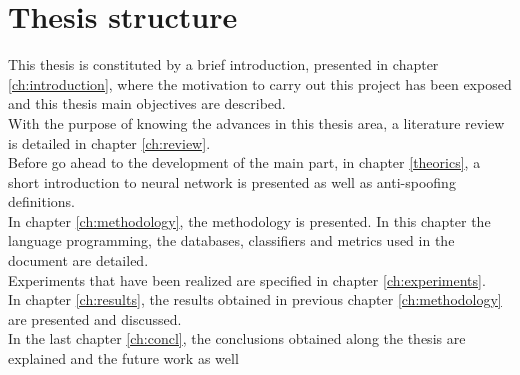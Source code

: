 \section{Thesis structure}
This thesis is constituted by a brief introduction, presented in chapter \ref{ch:introduction}, where the motivation to carry out this project has been exposed and this thesis main objectives are described.\\

With the purpose of knowing the advances in this thesis area, a literature review is detailed in chapter \ref{ch:review}.\\

Before go ahead to the development of the main part, in chapter \ref{theorics}, a short introduction to neural network is presented as well as anti-spoofing definitions.\\

In chapter \ref{ch:methodology}, the methodology is presented. In this chapter the language programming, the databases, classifiers and metrics used in the document are detailed.\\

Experiments that have been realized are specified in chapter \ref{ch:experiments}.\\

In chapter \ref{ch:results}, the results obtained in previous chapter \ref{ch:methodology} are presented and discussed.\\

In the last chapter \ref{ch:concl}, the conclusions obtained along the thesis are explained and the future work as well\\
